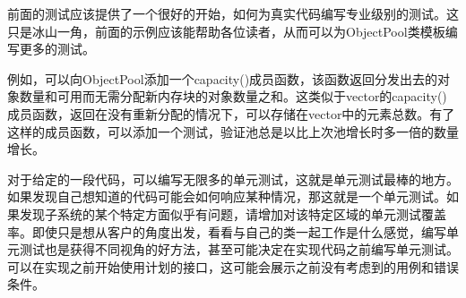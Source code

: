 
前面的测试应该提供了一个很好的开始，如何为真实代码编写专业级别的测试。这只是冰山一角，前面的示例应该能帮助各位读者，从而可以为ObjectPool类模板编写更多的测试。

例如，可以向ObjectPool添加一个capacity()成员函数，该函数返回分发出去的对象数量和可用而无需分配新内存块的对象数量之和。这类似于vector的capacity()成员函数，返回在没有重新分配的情况下，可以存储在vector中的元素总数。有了这样的成员函数，可以添加一个测试，验证池总是以比上次池增长时多一倍的数量增长。

对于给定的一段代码，可以编写无限多的单元测试，这就是单元测试最棒的地方。如果发现自己想知道的代码可能会如何响应某种情况，那这就是一个单元测试。如果发现子系统的某个特定方面似乎有问题，请增加对该特定区域的单元测试覆盖率。即使只是想从客户的角度出发，看看与自己的类一起工作是什么感觉，编写单元测试也是获得不同视角的好方法，甚至可能决定在实现代码之前编写单元测试。可以在实现之前开始使用计划的接口，这可能会展示之前没有考虑到的用例和错误条件。



















